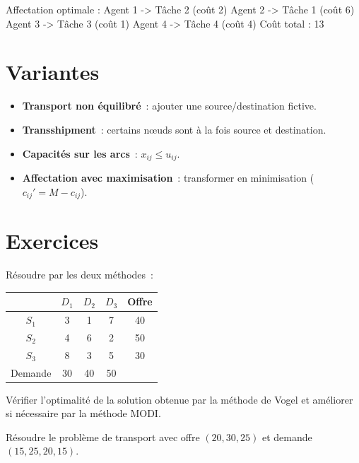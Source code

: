 \begin{codeoutput}
Affectation optimale :
  Agent 1 -> Tâche 2 (coût 2)
  Agent 2 -> Tâche 1 (coût 6)
  Agent 3 -> Tâche 3 (coût 1)
  Agent 4 -> Tâche 4 (coût 4)
Coût total : 13
\end{codeoutput}

\section{Variantes}

\begin{itemize}
  \item \textbf{Transport non \'equilibr\'e}~: ajouter une source/destination
        fictive.
  \item \textbf{Transshipment}~: certains n\oe uds sont \`a la fois source et
        destination.
  \item \textbf{Capacit\'es sur les arcs}~: $x_{ij} \le u_{ij}$.
  \item \textbf{Affectation avec maximisation}~: transformer en minimisation
        ($c_{ij}' = M - c_{ij}$).
\end{itemize}

\section{Exercices}

\begin{exercice}
R\'esoudre par les deux m\'ethodes~:
\begin{center}
\begin{tabular}{c|ccc|c}
  & $D_1$ & $D_2$ & $D_3$ & Offre \\
  \hline
  $S_1$ & 3 & 1 & 7 & 40 \\
  $S_2$ & 4 & 6 & 2 & 50 \\
  $S_3$ & 8 & 3 & 5 & 30 \\
  \hline
  Demande & 30 & 40 & 50 & \\
\end{tabular}
\end{center}
\end{exercice}

\begin{exercice}
V\'erifier l'optimalit\'e de la solution obtenue par la m\'ethode de Vogel
et am\'eliorer si n\'ecessaire par la m\'ethode MODI.
\end{exercice}

\begin{exercice}
R\'esoudre le probl\`eme de transport avec offre $(20, 30, 25)$ et demande
$(15, 25, 20, 15)$.
\end{exercice}

